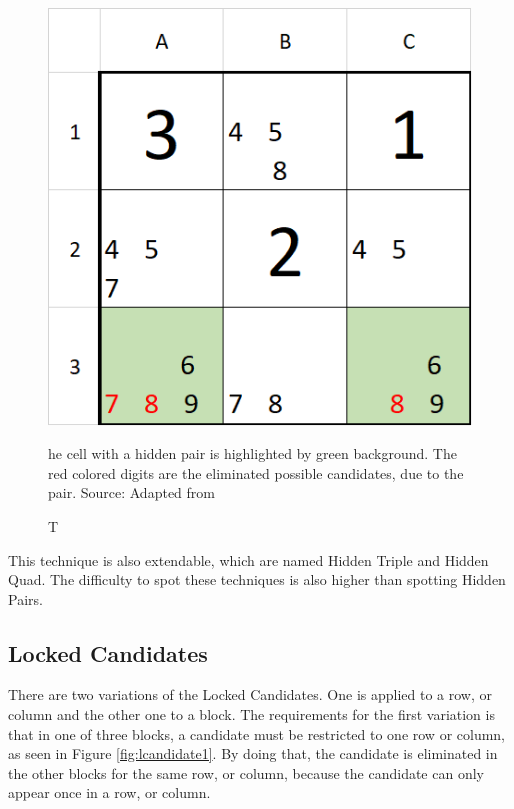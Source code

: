 \documentclass[twoside]{ausarbeitung}
\begin{document}
\begin{figure}[H]
  \centering
  \includegraphics[width=.25\linewidth]{images/hiddenpair}
  \caption[Hidden Pair] The cell with a hidden pair is highlighted by green background. The red colored digits are the eliminated possible candidates, due to the pair. Source: Adapted from \cite{SudokuHi85:online}
  \label{fig:hiddenpair}
\end{figure}%

This technique is also extendable, which are named Hidden Triple and Hidden Quad. The difficulty to spot these techniques is also higher than spotting Hidden Pairs.

\subsection{Locked Candidates} \label{ss:lcandidates}
There are two variations of the Locked Candidates. One is applied to a row, or column and the other one to a block. The requirements for the first variation is that in one of three blocks, a candidate must be restricted to one row or column, as seen in Figure \ref{fig:lcandidate1}. By doing that, the candidate is eliminated in the other blocks for the same row, or column, because the candidate can only appear once in a row, or column. 
\end{document}

